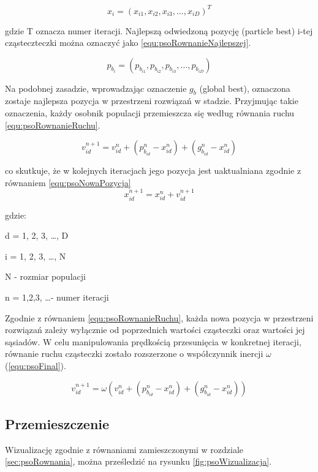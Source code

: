 \begin{equation}
\label{equ:psoRownanieCzasteczki}
x_i = (x_{i1}, x_{i2}, x_{i3}, \dots, x_{iD})^T
\end{equation}

gdzie T oznacza numer iteracji. Najlepszą odwiedzoną pozycję (particle best) i-tej cząsteczteczki można oznaczyć jako \ref{equ:psoRownanieNajlepszej}.

\begin{equation}
\label{equ:psoRownanieNajlepszej}
p_{b_i} = (p_{b_{i1}}, p_{b_{i2}}, p_{b_{i3}}, \dots, p_{b_{iD}})
\end{equation}

Na podobnej zasadzie, wprowadzając oznaczenie $g_b$ (global best), oznaczona zostaje najlepsza pozycja w przestrzeni rozwiązań w stadzie. Przyjmując takie oznaczenia, każdy osobnik populacji przemieszcza się według równania ruchu \ref{equ:psoRownanieRuchu}.

\begin{equation}
\label{equ:psoRownanieRuchu}
v_{id}^{n+1} = v_{id}^{n} + (p_{b_{id}}^n - x_{id}^n) + (g_{b_{id}}^n - x_{id}^n)
\end{equation}

co skutkuje, że w kolejnych iteracjach jego pozycja jest uaktualniana zgodnie z równaniem \ref{equ:psoNowaPozycja}
\begin{equation}
\label{equ:psoNowaPozycja}
x_{id}^{n+1} = x_{id}^n + v_{id}^{n+1}
\end{equation}

gdzie:

d = 1, 2, 3, \dots, D

i = 1, 2, 3, \dots, N

N - rozmiar populacji

n = 1,2,3, \dots - numer iteracji

Zgodnie z równaniem \ref{equ:psoRownanieRuchu}, każda nowa pozycja w przestrzeni rozwiązań zależy wyłącznie od poprzednich wartości cząsteczki oraz wartości jej sąsiadów. W celu manipulowania prędkością przesunięcia w konkretnej iteracji, równanie ruchu cząsteczki zostało rozszerzone o współczynnik inercji $\omega$ (\ref{equ:psoFinal}).

\begin{equation}
\label{equ:psoFinal}
v_{id}^{n+1} = \omega(v_{id}^{n} + (p_{b_{id}}^n - x_{id}^n) + (g_{b_{id}}^n - x_{id}^n))
\end{equation}


\subsection{Przemieszczenie}
\label{sec:psoPrzemieszczenie}
Wizualizację zgodnie z równaniami zamieszczonymi w rozdziale \ref{sec:psoRownania}, można prześledzić na rysunku \ref{fig:psoWizualizacja}.

